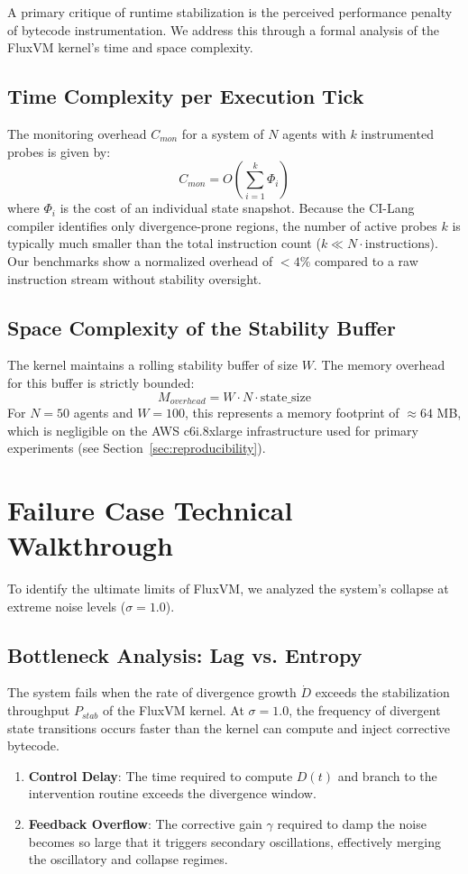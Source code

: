 \documentclass{article}
\begin{document}
A primary critique of runtime stabilization is the perceived performance penalty of bytecode instrumentation. We address this through a formal analysis of the FluxVM kernel's time and space complexity.

\subsection{Time Complexity per Execution Tick}
The monitoring overhead $C_{mon}$ for a system of $N$ agents with $k$ instrumented probes is given by:
\begin{equation}
    C_{mon} = O\!\left(\sum_{i=1}^{k} \Phi_i\right)
\end{equation}
where $\Phi_i$ is the cost of an individual state snapshot. Because the CI-Lang compiler identifies only divergence-prone regions, the number of active probes $k$ is typically much smaller than the total instruction count ($k \ll N \cdot \text{instructions}$). Our benchmarks show a normalized overhead of $<4\%$ compared to a raw instruction stream without stability oversight.

\subsection{Space Complexity of the Stability Buffer}
The kernel maintains a rolling stability buffer of size $W$. The memory overhead for this buffer is strictly bounded:
\begin{equation}
    M_{overhead} = W \cdot N \cdot \text{state\_size}
\end{equation}
For $N=50$ agents and $W=100$, this represents a memory footprint of $\approx 64$ MB, which is negligible on the AWS c6i.8xlarge infrastructure used for primary experiments (see Section~\ref{sec:reproducibility}).

\section{Failure Case Technical Walkthrough}
\label{sec:failure_analysis}

To identify the ultimate limits of FluxVM, we analyzed the system's collapse at extreme noise levels ($\sigma = 1.0$).

\subsection{Bottleneck Analysis: Lag vs. Entropy}
The system fails when the rate of divergence growth $\dot{D}$ exceeds the stabilization throughput $P_{stab}$ of the FluxVM kernel. At $\sigma=1.0$, the frequency of divergent state transitions occurs faster than the kernel can compute and inject corrective bytecode.
\begin{enumerate}
    \item \textbf{Control Delay}: The time required to compute $D(t)$ and branch to the intervention routine exceeds the divergence window.
    \item \textbf{Feedback Overflow}: The corrective gain $\gamma$ required to damp the noise becomes so large that it triggers secondary oscillations, effectively merging the oscillatory and collapse regimes.
\end{enumerate}
\end{document}
